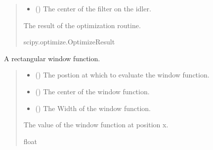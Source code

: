 \documentclass[a4paper,10pt,english]{sphinxmanual}
\begin{document}
\begin{fulllineitems}
\begin{quote}
\begin{description}
\begin{itemize}
\item {} 
\sphinxAtStartPar
{} () \textendash{} The center of the filter on the idler.

\end{itemize}

\sphinxAtStartPar
The result of the optimization routine.

\sphinxAtStartPar
scipy.optimize.OptimizeResult

\end{description}\end{quote}

\end{fulllineitems}


\begin{fulllineitems}
\label{\detokenize{experiment:pyjsa.experiment.rect}}
\pysigstartsignatures
{}
\pysigstopsignatures
\sphinxAtStartPar
A rectangular window function.
\begin{quote}\begin{description}
\begin{itemize}
\item {} 
\sphinxAtStartPar
{} () \textendash{} The postion at which to evaluate the window function.

\item {} 
\sphinxAtStartPar
{} () \textendash{} The center of the window function.

\item {} 
\sphinxAtStartPar
{} () \textendash{} The Width of the window function.

\end{itemize}

\sphinxAtStartPar
The value of the window function at position x.

\sphinxAtStartPar
float

\end{description}\end{quote}

\end{fulllineitems}
\end{document}
